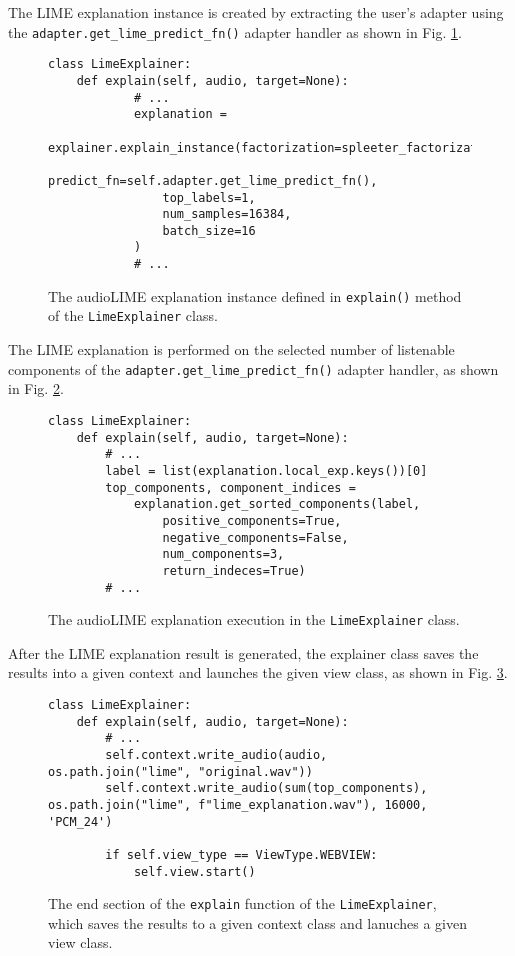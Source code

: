 \documentclass[
    bindingoffset=5mm,  %
    footnoteindent=3mm, %
    hyphenation=true    %
]{src/wut-thesis}
\begin{document}
The LIME explanation instance is created by extracting the user's adapter using
the \texttt{adapter.get_lime_predict_fn()} adapter handler as shown in Fig. \ref{fig:LimeExplExecution}.

\begin{figure}[h!]
\begin{verbatim}
class LimeExplainer:
    def explain(self, audio, target=None):
            # ...
            explanation = 
            explainer.explain_instance(factorization=spleeter_factorization,
                predict_fn=self.adapter.get_lime_predict_fn(),
                top_labels=1,
                num_samples=16384,
                batch_size=16
            )
            # ...
\end{verbatim}
\caption{The audioLIME explanation instance defined in \texttt{explain()} method of the \texttt{LimeExplainer} class.}
\label{fig:LimeExplExecution}
\end{figure}

The LIME explanation is performed on the selected number of listenable components of
the \texttt{adapter.get_lime_predict_fn()} adapter handler, as shown in Fig. \ref{fig:LimeGetSortedComps}.

\begin{figure}[h!]
\begin{verbatim}
class LimeExplainer:
    def explain(self, audio, target=None):
        # ...
        label = list(explanation.local_exp.keys())[0]
        top_components, component_indices =
            explanation.get_sorted_components(label,
                positive_components=True,
                negative_components=False,
                num_components=3,
                return_indeces=True)
        # ...
\end{verbatim}
\caption{The audioLIME explanation execution in the \texttt{LimeExplainer} class.}
\label{fig:LimeGetSortedComps}
\end{figure}

After the LIME explanation result is generated, the explainer class saves the results
into a given context and launches the given view class, as shown in Fig. \ref{fig:LimeSaveResults}.

\begin{figure}[h!]
\begin{verbatim}
class LimeExplainer:
    def explain(self, audio, target=None):
        # ...
        self.context.write_audio(audio, os.path.join("lime", "original.wav"))
        self.context.write_audio(sum(top_components), os.path.join("lime", f"lime_explanation.wav"), 16000, 'PCM_24')

        if self.view_type == ViewType.WEBVIEW:
            self.view.start()
\end{verbatim}
\caption{The end section of the \texttt{explain} function of the \texttt{LimeExplainer}, which saves the results to a given context class and lanuches a given view class.}
\label{fig:LimeSaveResults}
\end{figure}
\end{document}
